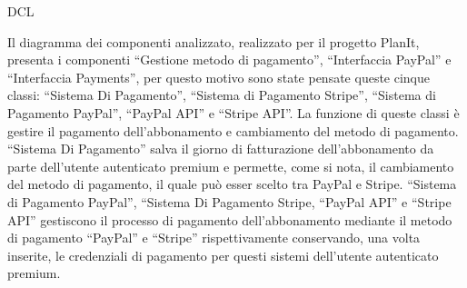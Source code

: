 \begin{listaPersonale}{DCL}
\begin{listaPersonale2}[DCL]{}
        Il diagramma dei componenti analizzato, realizzato per il progetto PlanIt, presenta i componenti “Gestione metodo di pagamento”, “Interfaccia PayPal” e “Interfaccia Payments”, per questo motivo sono state pensate queste cinque classi: “Sistema Di Pagamento”, “Sistema di Pagamento Stripe”, “Sistema di Pagamento PayPal”, “PayPal API” e “Stripe API”. La funzione di queste classi è gestire il pagamento dell'abbonamento e cambiamento del metodo di pagamento. “Sistema Di Pagamento” salva il giorno di fatturazione dell'abbonamento da parte dell'utente autenticato premium e  permette, come si nota, il cambiamento del metodo di pagamento, il quale può esser scelto tra PayPal e Stripe.
        “Sistema di Pagamento PayPal”, “Sistema Di Pagamento Stripe, “PayPal API” e “Stripe API” gestiscono il processo di pagamento dell'abbonamento mediante il metodo di pagamento “PayPal” e “Stripe” rispettivamente conservando, una volta inserite, le credenziali di pagamento per questi sistemi dell'utente autenticato premium.
        \begin{comment}
            \begin{center}
                \\
                \blfootnote{Immagine \href{https://github.com/Life-planner/Documentazione/blob/main/D3/img/Diagrammi/png/path/to/img.png}{PNG}/\href{https://github.com/Life-planner/Documentazione/blob/main/D3/img/Diagrammi/svg/path/to/img.svg}{SVG} nome file}
            \end{center}
        \end{comment}

    \end{listaPersonale2}



\end{listaPersonale}
